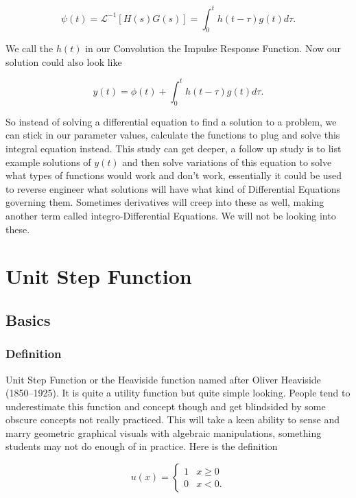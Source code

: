 \documentclass[12pt]{article}
\newcommand{\lp}{\mathscr{L}}
\begin{document}
\begin{equation*}
    \psi(t)=\lp^{-1}[H(s)G(s)] = \int_{0}^{t} h(t-\tau)g(t) d\tau.
\end{equation*}

We call the $h(t)$ in our Convolution the Impulse Response Function. Now our solution could also look like

\begin{equation*}
    y(t) = \phi(t)+\int_{0}^{t} h(t-\tau)g(t) d\tau.
\end{equation*}

So instead of solving a differential equation to find a solution to a problem, we can stick in our parameter values, calculate the functions to plug and solve this integral equation instead. This study can get deeper, a follow up study is to list example solutions of $y(t)$ and then solve variations of this equation to solve what types of functions would work and don't work, essentially it could be used to reverse engineer what solutions will have what kind of Differential Equations governing them. Sometimes derivatives will creep into these as well, making another term called integro-Differential Equations. We will not be looking into these.

\section{Unit Step Function}

\subsection{Basics}

\subsubsection{Definition}

Unit Step Function or the Heaviside function named after Oliver Heaviside (1850–1925). It is quite a utility function but quite simple looking. People tend to underestimate this function and concept though and get blindsided by some obscure concepts not really practiced. This will take a keen ability to sense and marry geometric graphical visuals with algebraic manipulations, something students may not do enough of in practice. Here is the definition

\begin{equation*}
    u(x)=\left\{
        \begin{array}{rl}
            1 &  x \geq 0  \\
            0 &  x < 0.
        \end{array}
    \right.
\end{equation*}
\end{document}
